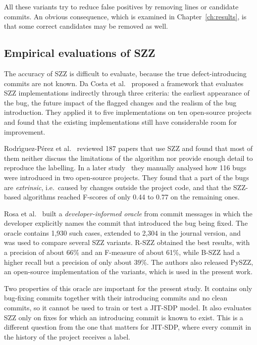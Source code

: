 \documentclass[12pt,a4paper,oneside]{report}
\begin{document}
All these variants try to reduce false positives by removing lines or
candidate commits. An obvious consequence, which is examined in
Chapter~\ref{ch:results}, is that some correct candidates may be removed as
well.

\subsection{Empirical evaluations of SZZ}

The accuracy of SZZ is difficult to evaluate, because the true
defect-introducing commits are not known. Da Costa et
al.~\cite{dacosta2017maszz} proposed a framework that evaluates SZZ
implementations indirectly through three criteria: the earliest appearance of
the bug, the future impact of the flagged changes and the realism of the bug
introduction. They applied it to five implementations on ten open-source
projects and found that the existing implementations still have considerable
room for improvement.

Rodr\'{\i}guez-P\'{e}rez et al.~\cite{rodriguez2018szz} reviewed 187 papers
that use SZZ and found that most of them neither discuss the limitations of
the algorithm nor provide enough detail to reproduce the labelling. In a later
study~\cite{rodriguez2020bugs} they manually analysed how 116 bugs were
introduced in two open-source projects. They found that a part of the bugs
are \emph{extrinsic}, i.e.\ caused by changes outside the project code, and
that the SZZ-based algorithms reached F-scores of only 0.44 to 0.77 on the
remaining ones.

Rosa et al.~\cite{rosa2021oracle,rosa2023szzvariants} built a
\emph{developer-informed oracle} from commit messages in which the developer
explicitly names the commit that introduced the bug being fixed. The oracle
contains 1,930 such cases, extended to 2,304 in the journal version, and was
used to compare several SZZ variants. R-SZZ obtained the best results, with a
precision of about 66\% and an F-measure of about 61\%, while B-SZZ had a
higher recall but a precision of only about 39\%. The authors also released
PySZZ, an open-source implementation of the variants, which is used in the
present work.

Two properties of this oracle are important for the present study. It
contains only bug-fixing commits together with their introducing commits and
no clean commits, so it cannot be used to train or test a JIT-SDP model. It
also evaluates SZZ only on fixes for which an introducing commit is known to
exist. This is a different question from the one that matters for JIT-SDP,
where every commit in the history of the project receives a label.
\end{document}
